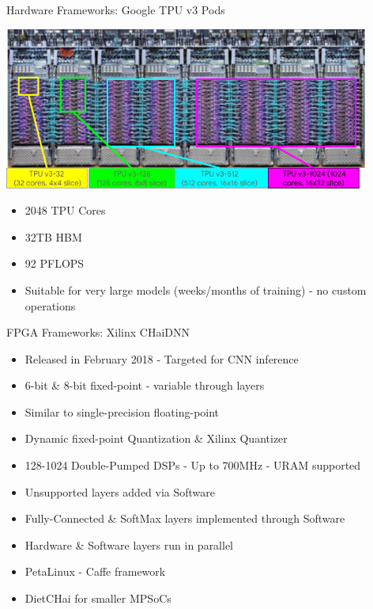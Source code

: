 \begin{frame}{Hardware Frameworks: Google TPU v3 Pods}
	\begin{minipage}{0.7\textwidth}
		\centering
		\includegraphics[width=0.9\textwidth]{../Images/Hardware/tpu-v3-pods.png}\\
	\end{minipage}%
	\begin{minipage}{0.3\textwidth}
		\begin{itemize}
			\item 2048 TPU Cores
			\item 32TB HBM
			\item 92 PFLOPS
			\item Suitable for very large models (weeks/months of training) - no custom operations
		\end{itemize}
	\end{minipage}
\end{frame}

\begin{frame}{FPGA Frameworks: Xilinx CHaiDNN}
	\begin{itemize}
		\item Released in February 2018 - Targeted for CNN inference
		\item 6-bit \& 8-bit fixed-point - variable through layers
		\item Similar to single-precision floating-point
		\item Dynamic fixed-point Quantization \& Xilinx Quantizer
		\item 128-1024 Double-Pumped DSPs - Up to 700MHz - URAM supported
		\item Unsupported layers added via Software
		\item Fully-Connected \& SoftMax layers implemented through Software
		\item Hardware \& Software layers run in parallel
		\item PetaLinux - Caffe framework
		\item DietCHai for smaller MPSoCs
	\end{itemize}
\end{frame}

